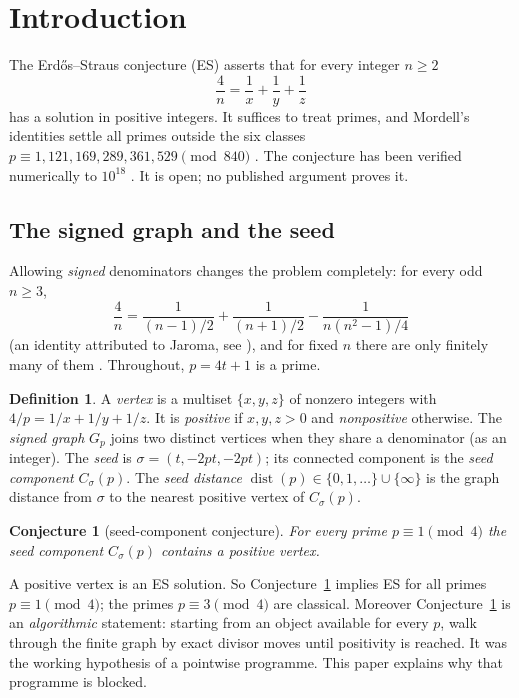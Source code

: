 \documentclass[11pt,reqno]{amsart}
\newtheorem{conjecture}[theorem]{Conjecture}
\theoremstyle{definition}
\newtheorem{definition}[theorem]{Definition}
\newcommand{\dist}{\operatorname{dist}}
\begin{document}
\section{Introduction}\label{sec:intro}

The Erd\H{o}s--Straus conjecture (ES) asserts that for every integer $n\ge2$
\begin{equation}\label{eq:ES}
 \frac4n=\frac1x+\frac1y+\frac1z
\end{equation}
has a solution in positive integers.  It suffices to treat primes, and
Mordell's identities settle all primes outside the six classes
$p\equiv1,121,169,289,361,529\pmod{840}$ \cite{Mordell}.  The conjecture has
been verified numerically to $10^{18}$ \cite{MD}.  It is open; no published
argument proves it.

\subsection{The signed graph and the seed}
Allowing \emph{signed} denominators changes the problem completely: for
every odd $n\ge3$,
\[
 \frac4n=\frac{1}{(n-1)/2}+\frac{1}{(n+1)/2}-\frac{1}{n(n^2-1)/4}
\]
(an identity attributed to Jaroma, see \cite[\S1 and ref.~14]{BL}),
and for fixed $n$ there are only finitely many of them \cite[Lemma~3.10]{BL}.
Throughout, $p=4t+1$ is a prime.

\begin{definition}\label{def:graph}
A \emph{vertex} is a multiset $\{x,y,z\}$ of nonzero integers with
$4/p=1/x+1/y+1/z$.  It is \emph{positive} if $x,y,z>0$ and
\emph{nonpositive} otherwise.  The \emph{signed graph} $G_p$ joins two
distinct vertices when they share a denominator (as an integer).  The
\emph{seed} is $\sigma=(t,-2pt,-2pt)$; its connected component is the
\emph{seed component} $C_\sigma(p)$.  The \emph{seed distance}
$\dist(p)\in\{0,1,\dots\}\cup\{\infty\}$ is the graph distance from $\sigma$
to the nearest positive vertex of $C_\sigma(p)$.
\end{definition}

\begin{conjecture}[seed-component conjecture]\label{conj:seed}
For every prime $p\equiv1\pmod4$ the seed component $C_\sigma(p)$
contains a positive vertex.
\end{conjecture}

A positive vertex is an ES solution.  So Conjecture~\ref{conj:seed} implies
ES for all primes $p\equiv1\pmod4$; the primes $p\equiv3\pmod4$ are
classical.  Moreover Conjecture~\ref{conj:seed} is an
\emph{algorithmic} statement: starting from an object available for every
$p$, walk through the finite graph by exact divisor moves until positivity
is reached.  It was the working hypothesis of a pointwise programme.  This
paper explains why that programme is blocked.
\end{document}
